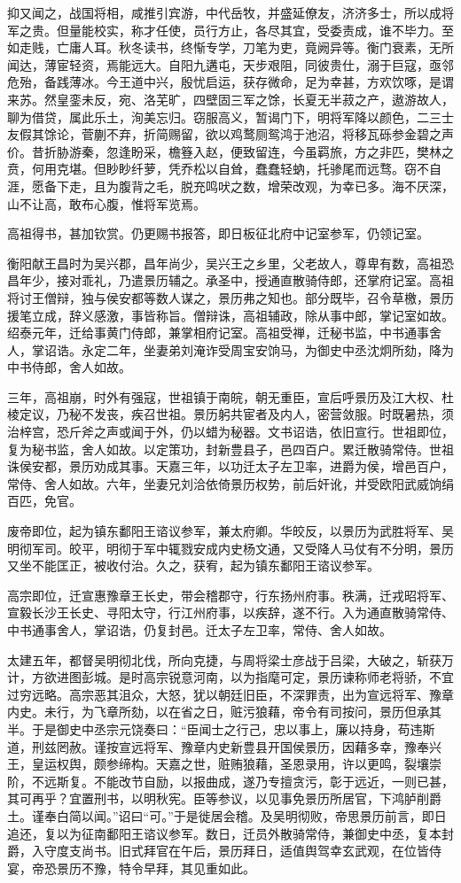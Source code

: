 \documentclass[]{article}
\begin{document}
抑又闻之，战国将相，咸推引宾游，中代岳牧，并盛延僚友，济济多士，所以成将军之贵。但量能校实，称才任使，员行方止，各尽其宜，受委责成，谁不毕力。至如走贱，亡庸人耳。秋冬读书，终惭专学，刀笔为吏，竟阙异等。衡门衰素，无所闻达，薄宦轻资，焉能远大。自阳九遘屯，天步艰阻，同彼贵仕，溺于巨寇，亟邻危殆，备践薄冰。今王道中兴，殷忧启运，获存微命，足为幸甚，方欢饮啄，是谓来苏。然皇銮未反，宛、洛芜旷，四壁固三军之馀，长夏无半菽之产，遨游故人，聊为借贷，属此乐土，洵美忘归。窃服高义，暂谒门下，明将军降以颜色，二三士友假其馀论，菅蒯不弃，折简赐留，欲以鸡鹜厕鸳鸿于池沼，将移瓦砾参金碧之声价。昔折胁游秦，忽逢盼采，檐簦入赵，便致留连，今虽羁旅，方之非匹，樊林之贲，何用克堪。但眇眇纤萝，凭乔松以自耸，蠢蠢轻蚋，托骖尾而远骛。窃不自涯，愿备下走，且为腹背之毛，脱充鸣吠之数，增荣改观，为幸已多。海不厌深，山不让高，敢布心腹，惟将军览焉。

高祖得书，甚加钦赏。仍更赐书报答，即日板征北府中记室参军，仍领记室。

衡阳献王昌时为吴兴郡，昌年尚少，吴兴王之乡里，父老故人，尊卑有数，高祖恐昌年少，接对乖礼，乃遣景历辅之。承圣中，授通直散骑侍郎，还掌府记室。高祖将讨王僧辩，独与侯安都等数人谋之，景历弗之知也。部分既毕，召令草檄，景历援笔立成，辞义感激，事皆称旨。僧辩诛，高祖辅政，除从事中郎，掌记室如故。绍泰元年，迁给事黄门侍郎，兼掌相府记室。高祖受禅，迁秘书监，中书通事舍人，掌诏诰。永定二年，坐妻弟刘淹诈受周宝安饷马，为御史中丞沈炯所劾，降为中书侍郎，舍人如故。

三年，高祖崩，时外有强寇，世祖镇于南皖，朝无重臣，宣后呼景历及江大权、杜棱定议，乃秘不发丧，疾召世祖。景历躬共宦者及内人，密营敛服。时既暑热，须治梓宫，恐斤斧之声或闻于外，仍以蜡为秘器。文书诏诰，依旧宣行。世祖即位，复为秘书监，舍人如故。以定策功，封新豊县子，邑四百户。累迁散骑常侍。世祖诛侯安都，景历劝成其事。天嘉三年，以功迁太子左卫率，进爵为侯，增邑百户，常侍、舍人如故。六年，坐妻兄刘洽依倚景历权势，前后奸讹，并受欧阳武威饷绢百匹，免官。

废帝即位，起为镇东鄱阳王谘议参军，兼太府卿。华皎反，以景历为武胜将军、吴明彻军司。皎平，明彻于军中辄戮安成内史杨文通，又受降人马仗有不分明，景历又坐不能匡正，被收付治。久之，获宥，起为镇东鄱阳王谘议参军。

高宗即位，迁宣惠豫章王长史，带会稽郡守，行东扬州府事。秩满，迁戎昭将军、宣毅长沙王长史、寻阳太守，行江州府事，以疾辞，遂不行。入为通直散骑常侍、中书通事舍人，掌诏诰，仍复封邑。迁太子左卫率，常侍、舍人如故。

太建五年，都督吴明彻北伐，所向克捷，与周将梁士彦战于吕梁，大破之，斩获万计，方欲进图彭城。是时高宗锐意河南，以为指麾可定，景历谏称师老将骄，不宜过穷远略。高宗恶其沮众，大怒，犹以朝廷旧臣，不深罪责，出为宣远将军、豫章内史。未行，为飞章所劾，以在省之日，赃污狼藉，帝令有司按问，景历但承其半。于是御史中丞宗元饶奏曰：``臣闻士之行己，忠以事上，廉以持身，苟违斯道，刑兹罔赦。谨按宣远将军、豫章内史新豊县开国侯景历，因藉多幸，豫奉兴王，皇运权舆，颇参缔构。天嘉之世，赃贿狼藉，圣恩录用，许以更鸣，裂壤崇阶，不远斯复。不能改节自励，以报曲成，遂乃专擅贪污，彰于远近，一则已甚，其可再乎？宜置刑书，以明秋宪。臣等参议，以见事免景历所居官，下鸿胪削爵土。谨奉白简以闻。''诏曰``可。''于是徙居会稽。及吴明彻败，帝思景历前言，即日追还，复以为征南鄱阳王谘议参军。数日，迁员外散骑常侍，兼御史中丞，复本封爵，入守度支尚书。旧式拜官在午后，景历拜日，适值舆驾幸玄武观，在位皆侍宴，帝恐景历不豫，特令早拜，其见重如此。
\end{document}
